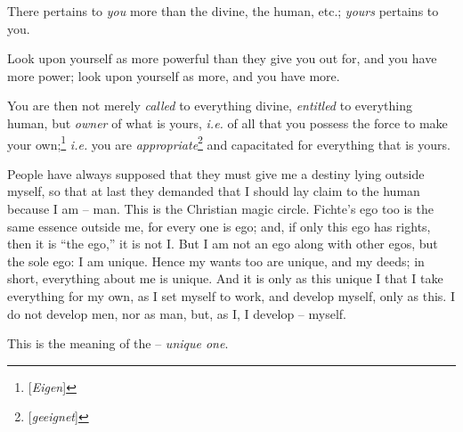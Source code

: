 There pertains to \textit{you} more than the divine, the human, etc.; 
\textit{yours} pertains to you.

Look upon yourself as more powerful than they give you out for, and you have 
more power; look upon yourself as more, and you have more.

You are then not merely \textit{called} to everything divine, 
\textit{entitled} to everything human, but \textit{owner} of what is yours, 
\textit{i.e.} of all that you possess the force to make your 
own;\footnote{[\textit{Eigen}]} \textit{i.e.} you are 
\textit{appropriate}\footnote{[\textit{geeignet}]} and capacitated for 
everything that is yours.

People have always supposed that they must give me a destiny lying outside 
myself, so that at last they demanded that I should lay claim to the human 
because I am -- man. This is the Christian magic circle. Fichte's ego too is 
the same essence outside me, for every one is ego; and, if only this ego has 
rights, then it is ``the ego,'' it is not I. But I am not an ego along with 
other egos, but the sole ego: I am unique. Hence my wants too are unique, and 
my deeds; in short, everything about me is unique. And it is only as this 
unique I that I take everything for my own, as I set myself to work, and 
develop myself, only as this. I do not develop men, nor as man, but, as I, I 
develop -- myself.

This is the meaning of the -- \textit{unique one}.

